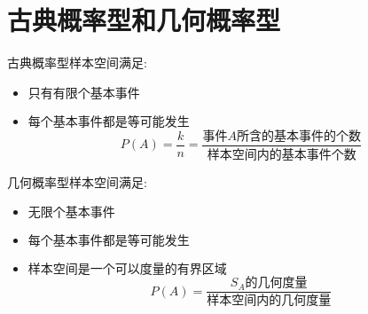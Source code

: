\section{古典概率型和几何概率型}
\begin{definition}[古典概率型]
	古典概率型样本空间满足: 
	\begin{itemize}
		\item $\text{只有有限个基本事件}$
		\item $\text{每个基本事件都是等可能发生}$
		$$P(A)=\dfrac{k}{n}=\dfrac{\text{事件}A\text{所含的基本事件的个数}}{\text{样本空间内的基本事件个数}}$$
	\end{itemize}
\end{definition}
\begin{definition}[几何概率型]
	几何概率型样本空间满足: 
	\begin{itemize}
		\item $\text{无限个基本事件}$
		\item $\text{每个基本事件都是等可能发生}$
		\item $\text{样本空间是一个可以度量的有界区域}$
		$$P(A)=\dfrac{S_{A}\text{的几何度量}}{\text{样本空间内的几何度量}}$$
	\end{itemize}
\end{definition}
